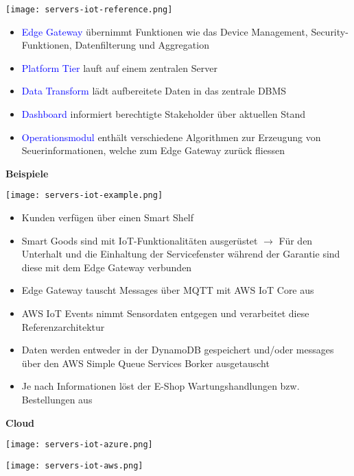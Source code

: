 \texttt{[image: servers-iot-reference.png]}

\begin{itemize}
    \item \textcolor{blue}{Edge Gateway} übernimmt Funktionen wie das Device Management, Security-Funktionen, Datenfilterung und Aggregation
    \item \textcolor{blue}{Platform Tier} lauft auf einem zentralen Server
    \item \textcolor{blue}{Data Transform} lädt aufbereitete Daten in das zentrale DBMS
    \item \textcolor{blue}{Dashboard} informiert berechtigte Stakeholder über aktuellen Stand
    \item \textcolor{blue}{Operationsmodul} enthält verschiedene Algorithmen zur Erzeugung von Seuerinformationen, welche zum Edge Gateway zurück fliessen
\end{itemize}
\vspace{10pt}
\textbf{Beispiele}

\texttt{[image: servers-iot-example.png]}

\begin{itemize}
    \item Kunden verfügen über einen Smart Shelf
    \item Smart Goods sind mit IoT-Funktionalitäten ausgerüstet $\rightarrow$ Für den Unterhalt und die Einhaltung der Servicefenster während der Garantie sind diese mit dem Edge Gateway verbunden
    \item Edge Gateway tauscht Messages über MQTT mit AWS IoT Core aus
    \item AWS IoT Events nimmt Sensordaten entgegen und verarbeitet diese Referenzarchitektur
    \item Daten werden entweder in der DynamoDB gespeichert und/oder messages über den AWS
    Simple Queue Services Borker ausgetauscht
    \item Je nach Informationen löst der E-Shop Wartungshandlungen bzw. Bestellungen aus
\end{itemize}
\vspace{10pt}
\columnbreak
\textbf{Cloud}

\texttt{[image: servers-iot-azure.png]}

\texttt{[image: servers-iot-aws.png]}

\vfill\null
\columnbreak

\vfill\null
\columnbreak


